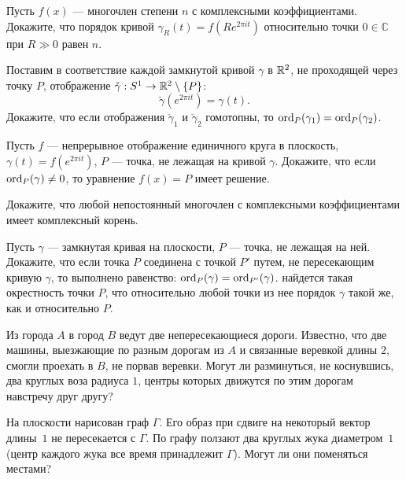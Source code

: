 \documentclass[a4paper,10pt]{article}
\newcommand{\0}[1]{\overline{#1}}
\renewcommand{\C}{\mathbb{C}}
\begin{document}
Пусть $f(x)$ --- многочлен степени $n$  с комплексными коэффициентами.
Докажите, что порядок кривой $\gamma_R(t)=f(Re^{2\pi it})$ относительно
точки $0\in\C$ при $R\gg0$ равен $n$.

Поставим в соответствие каждой замкнутой кривой $\gamma$ в $\mathbb{R}^2$, не
проходящей через точку $P$, отображение $\check\gamma:S^1\rightarrow
\mathbb{R}^2\setminus\{P\}$:
$$
\check\gamma(e^{2\pi it})=\gamma(t).
$$
Докажите, что если отображения $\check\gamma_1$ и $\check\gamma_2$
гомотопны, то $\operatorname{ord}_P(\gamma_1)=\operatorname{ord}_P(\gamma_2)$.

Пусть $f$ --- непрерывное отображение единичного круга в
плоскость,
$\gamma(t)=f(e^{2\pi it})$, $P$ --- точка, не лежащая
на кривой $\gamma$. Докажите, что если $\operatorname{ord}_P(\gamma)\ne0$, то
уравнение $f(x)=P$ имеет решение.  

Докажите, что любой непостоянный многочлен с комплексными коэффициентами
имеет комплексный корень.

Пусть $\gamma$ --- замкнутая кривая на плоскости, $P$ --- точка, не
лежащая на ней. Докажите, что
если точка $P$ соединена с точкой $P'$ путем, не пересекающим кривую
$\gamma$, то выполнено равенство:
$\operatorname{ord}_P(\gamma)=\operatorname{ord}_{P'}(\gamma)$.
найдется такая окрестность точки $P$, что относительно любой точки из
нее порядок $\gamma$ такой же, как и относительно $P$.

Из города $A$ в город $B$ ведут две непересекающиеся дороги. Известно,
что две машины, выезжающие по разным дорогам из $A$ и связанные
веревкой длины $2$, смогли проехать в $B$, не порвав веревки. Могут ли
разминуться, не коснувшись, два круглых воза радиуса $1$, центры которых
движутся по этим дорогам навстречу друг другу?

На плоскости нарисован граф $\Gamma$. Его образ при сдвиге на некоторый
вектор длины~$1$ не пересекается с $\Gamma$. По графу ползают два
круглых жука диаметром~$1$ (центр каждого жука все время принадлежит
$\Gamma$).  Могут ли они поменяться местами?

\end{document}
